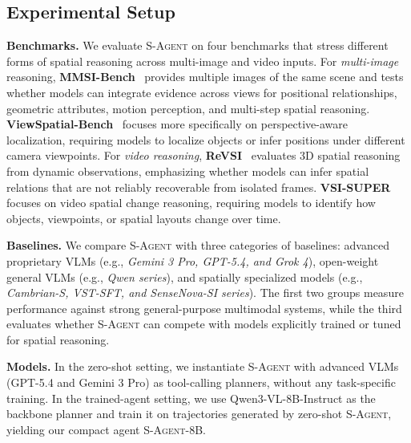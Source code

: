 \documentclass{llmxive}
\begin{document}
\begin{table}[t]
    \label{tab:mmsi_bench_zeroshot}
\caption{
    Detailed MMSI-Bench results. We follow the taxonomy of~\citep{mmsi_bench} and group dimensions into Positional Relationship, Geometric Attribute, Motion Perception, and Multi-step Reasoning (MSR). C/O/R denote camera/object/region in positional-relation subcategories. \textit{SenseNova} is abbreviated as \textit{SN}. Top-1/2/3 results are highlighted in \colorbox{top1color}{\textbf{deep}}, \colorbox{top2color}{medium}, and \colorbox{top3color}{light} lavender.}
\end{table}


\subsection{Experimental Setup}
\label{sec:experiments:setup}
\textbf{Benchmarks.}
We evaluate \textsc{S-Agent} on four benchmarks that stress different forms of spatial reasoning across multi-image and video inputs. 
% 
For \textit{multi-image} reasoning, \textbf{MMSI-Bench}~\citep{mmsi_bench} provides multiple images of the same scene and tests whether models can integrate evidence across views for positional relationships, geometric attributes, motion perception, and multi-step spatial reasoning. 
\textbf{ViewSpatial-Bench}~\citep{viewspatial_bench} focuses more specifically on perspective-aware localization, requiring models to localize objects or infer positions under different camera viewpoints. 
% 
For \textit{video reasoning}, \textbf{ReVSI}~\citep{revsi} evaluates 3D spatial reasoning from dynamic observations, emphasizing whether models can infer spatial relations that are not reliably recoverable from isolated frames. 
\textbf{VSI-SUPER}~\citep{cambrian_s} focuses on video spatial change reasoning, requiring models to identify how objects, viewpoints, or spatial layouts change over time.



\textbf{Baselines.}
We compare \textsc{S-Agent} with three categories of baselines: advanced proprietary VLMs (e.g., \textit{Gemini 3 Pro, GPT-5.4, and Grok 4}), open-weight general VLMs (e.g., \textit{Qwen series}), and spatially specialized models (e.g., \textit{Cambrian-S, VST-SFT, and SenseNova-SI series}). 
The first two groups measure performance against strong general-purpose multimodal systems, while the third evaluates whether \textsc{S-Agent} can compete with models explicitly trained or tuned for spatial reasoning.

\textbf{Models.} 
In the zero-shot setting, we instantiate \textsc{S-Agent} with advanced VLMs (GPT-5.4 and Gemini 3 Pro) as tool-calling planners, without any task-specific training. 
In the trained-agent setting, we use Qwen3-VL-8B-Instruct as the backbone planner and train it on trajectories generated by zero-shot \textsc{S-Agent}, yielding our compact agent \textsc{S-Agent-8B}.
\end{document}
